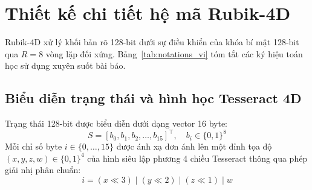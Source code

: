 \documentclass[10pt,twocolumn]{article}
\begin{document}
\section{Thiết kế chi tiết hệ mã Rubik-4D}
\label{sec:cipher}

Rubik-4D xử lý khối bản rõ 128-bit dưới sự điều khiển của khóa bí mật 128-bit qua $R = 8$ vòng lặp đối xứng. Bảng~\ref{tab:notations_vi} tóm tắt các ký hiệu toán học sử dụng xuyên suốt bài báo.

\begin{table}[htbp]
\caption{Quy ước ký hiệu toán học.}
\label{tab:notations_vi}
\centering
\small
{}
\end{table}

\subsection{Biểu diễn trạng thái và hình học Tesseract 4D}
Trạng thái 128-bit được biểu diễn dưới dạng vector 16 byte:
\begin{equation}
    S = [b_0, b_1, b_2, \dots, b_{15}]^\top, \quad b_i \in \{0, 1\}^8
\end{equation}
Mỗi chỉ số byte $i \in \{0, \dots, 15\}$ được ánh xạ đơn ánh lên một đỉnh tọa độ $(x, y, z, w) \in \{0, 1\}^4$ của hình siêu lập phương 4 chiều Tesseract thông qua phép giải nhị phân chuẩn:
\begin{equation}
    i = (x \ll 3) \mid (y \ll 2) \mid (z \ll 1) \mid w
\end{equation}
\end{document}
